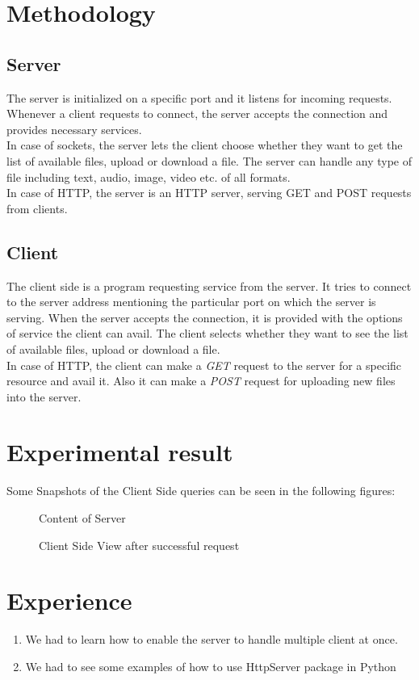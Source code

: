 \documentclass[11pt]{article}
\begin{document}
\section{Methodology}

\subsection{Server}
The server is initialized on a specific port and it listens for incoming requests. Whenever a client requests to connect, the server accepts the connection and provides necessary services.\\
In case of sockets, the server lets the client choose whether they want to get the list of available files, upload or download a file. The server can handle any type of file including text, audio, image, video etc. of all formats.\\
In case of HTTP, the server is an HTTP server, serving GET and POST requests from clients.

\subsection{Client}
The client side is a program requesting service from the server. It tries to connect to the server address mentioning the particular port on which the server is serving. When the server accepts the connection, it is provided with the options of service the client can avail. The client selects whether they want to see the list of available files, upload or download a file.\\
In case of HTTP, the client can make a \emph{GET} request to the server for a specific resource and avail it. Also it can make a \emph{POST} request for uploading new files into the server.

\section{Experimental result}

Some Snapshots of the Client Side queries can be seen in the following figures: 
\begin{figure}[!h]
\centering
\caption{Content of Server}
\end{figure}

\begin{figure}[!h]
\centering
\caption{Client Side View after successful request}
\end{figure}


\newpage
\section{Experience}
\begin{enumerate}
\item We had to learn how to enable the server to handle multiple client at once.
\item We had to see some examples of how to use HttpServer package in Python
\end{enumerate}



\nocite{*}
\end{document}
